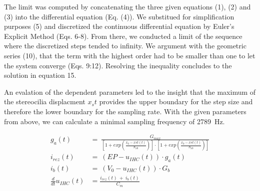 The limit was computed by concatenating the three given equations (1), (2) and (3) into the differential equation (Eq. (4)). We substitued for simplification purposes (5) and discretized the continuous differential equation by Euler's Explicit Method (Eqs. 6-8). From there, we conducted a limit of the sequence where the discretized steps tended to infinity. We argument with the geometric series (10), that the term with the highest order had to be smaller than one to let the system converge (Eqs. 9:12). Resolving the inequality concludes to the solution in equation 15. 

An evalation of the dependent parameters led to the insight that the maximum of the stereocilia displacment $x_st$ provides the upper boundary for the step size and therefore the lower boundary for the sampling rate. With the given parameters from above, we can calculate a minimal sampling frequency of \SI{2789}{\hertz}. 


\begin{align}
    \label{eq:model:g_a} g_a(t)\ &=\ \frac{G_{max}}{\left[1 +     exp(\frac{x_0-x{st}(t)}{S_{x0}})\right]\cdot\left[1 +     exp(\frac{x_0-x{st}(t)}{S_{x0}})\right]}\\ 
     \label{eq:model:ir}i_{rez}(t)\ &=\ (EP-u_{IHC}(t))\cdot g_a(t)\\
     \label{eq:model:ib}i_b(t)\ &=\ (V_0 - u_{IHC}(t))\cdot G_b\\
     \label{eq:model:u_ihc}\frac{d}{dt} u_{IHC}(t) &= \frac{i_{rez}(t)\ +\ i_b(t)}{C_m}
\end{align}

